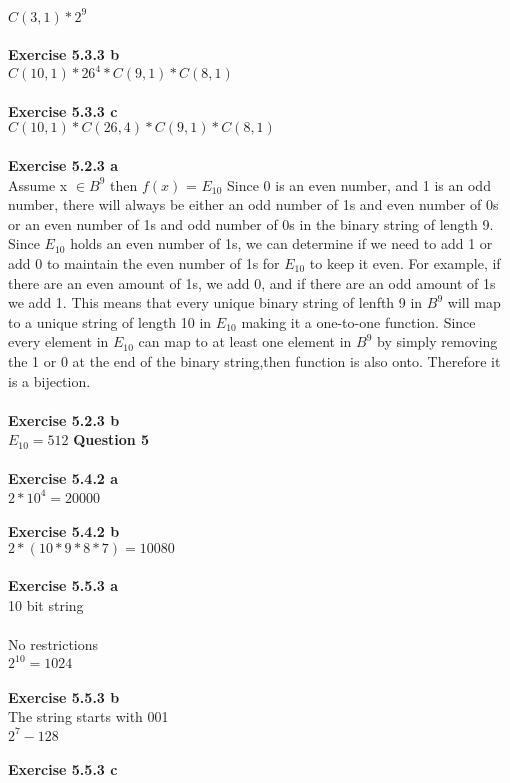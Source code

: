 \documentclass{article}
\begin{document}
$C(3,1) * 2^9$\\\\
\textbf{Exercise 5.3.3 b}\\
$C(10,1) * 26^4 * C(9,1) * C(8,1)$\\\\
\textbf{Exercise 5.3.3 c}\\
$C(10,1) * C(26,4) * C(9,1) * C(8,1)$\\\\
\textbf{Exercise 5.2.3 a}\\
Assume x $\in B^9$ then $f(x)$ = $E_{10}$ Since 0 is an even number, and 1 is an odd number, there will always be either an odd number of 1s and even number of 0s or an even number of 1s and odd number of 0s in the binary string of length 9. Since $E_{10}$ holds an even number of 1s, we can determine if we need to add 1 or add 0 to maintain the even number of 1s for $E_{10}$ to keep it even. For example, if there are an even amount of 1s, we add 0, and if there are an odd amount of 1s we add 1. This means that every unique binary string of lenfth 9 in $B^9$ will map to a unique string of length 10 in $E_{10}$ making it a one-to-one function. Since every element in $E_{10}$ can map to at least one element in $B^9$ by simply removing the 1 or 0 at the end of the binary string,then function is also onto. Therefore it is a bijection. \\\\
\textbf{Exercise 5.2.3 b}\\
$E_{10} = 512$
\newpage
\noindent \textbf{Question 5}\\\\
\textbf{Exercise 5.4.2 a}\\
$2 * 10^4 = 20000$\\\\
\textbf{Exercise 5.4.2 b}\\
$2 * (10 * 9 * 8 * 7) = 10080$\\\\
\textbf{Exercise 5.5.3 a}\\
10 bit string\\\\
No restrictions\\
$2^10 = 1024$\\\\
\textbf{Exercise 5.5.3 b}\\
The string starts with 001\\
$2^7 - 128$\\\\
\textbf{Exercise 5.5.3 c}\\
\end{document}
